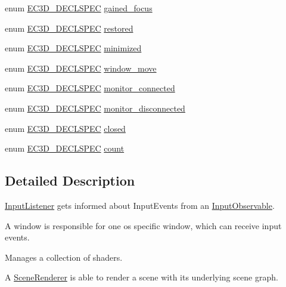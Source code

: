 \begin{DoxyCompactItemize}
\item 
enum \mbox{\hyperlink{_common_8h_aac42573e202ca3dd4d259c81691e2369}{E\+C3\+D\+\_\+\+D\+E\+C\+L\+S\+P\+EC}} \mbox{\hyperlink{namespaceec_a1e2dd185f2ea6b2729b32fec30917a0e}{gained\+\_\+focus}}
\item 
enum \mbox{\hyperlink{_common_8h_aac42573e202ca3dd4d259c81691e2369}{E\+C3\+D\+\_\+\+D\+E\+C\+L\+S\+P\+EC}} \mbox{\hyperlink{namespaceec_af316093f3fa4161f332a168bd91d598e}{restored}}
\item 
enum \mbox{\hyperlink{_common_8h_aac42573e202ca3dd4d259c81691e2369}{E\+C3\+D\+\_\+\+D\+E\+C\+L\+S\+P\+EC}} \mbox{\hyperlink{namespaceec_a5886b41b06c3a2522782c1129b38569d}{minimized}}
\item 
enum \mbox{\hyperlink{_common_8h_aac42573e202ca3dd4d259c81691e2369}{E\+C3\+D\+\_\+\+D\+E\+C\+L\+S\+P\+EC}} \mbox{\hyperlink{namespaceec_a435bfb057b6ec7278b405d423194057b}{window\+\_\+move}}
\item 
enum \mbox{\hyperlink{_common_8h_aac42573e202ca3dd4d259c81691e2369}{E\+C3\+D\+\_\+\+D\+E\+C\+L\+S\+P\+EC}} \mbox{\hyperlink{namespaceec_a2a1f0b9f84e0ccf8a264a846b5ca23ff}{monitor\+\_\+connected}}
\item 
enum \mbox{\hyperlink{_common_8h_aac42573e202ca3dd4d259c81691e2369}{E\+C3\+D\+\_\+\+D\+E\+C\+L\+S\+P\+EC}} \mbox{\hyperlink{namespaceec_ac7da3b2ff7c2bb148e07798a9e8e51f4}{monitor\+\_\+disconnected}}
\item 
enum \mbox{\hyperlink{_common_8h_aac42573e202ca3dd4d259c81691e2369}{E\+C3\+D\+\_\+\+D\+E\+C\+L\+S\+P\+EC}} \mbox{\hyperlink{namespaceec_a50f9b2ea9dbfffe311ceb6f857573272}{closed}}
\item 
enum \mbox{\hyperlink{_common_8h_aac42573e202ca3dd4d259c81691e2369}{E\+C3\+D\+\_\+\+D\+E\+C\+L\+S\+P\+EC}} \mbox{\hyperlink{namespaceec_a4dc8d59c4e90842e057344aefde0efbd}{count}}
\end{DoxyCompactItemize}


\subsection{Detailed Description}
\mbox{\hyperlink{classec_1_1_input_listener}{Input\+Listener}} gets informed about Input\+Events from an \mbox{\hyperlink{classec_1_1_input_observable}{Input\+Observable}}. 

A window is responsible for one os specific window, which can receive input events.

Manages a collection of shaders.

A \mbox{\hyperlink{classec_1_1_scene_renderer}{Scene\+Renderer}} is able to render a scene with its underlying scene graph.

